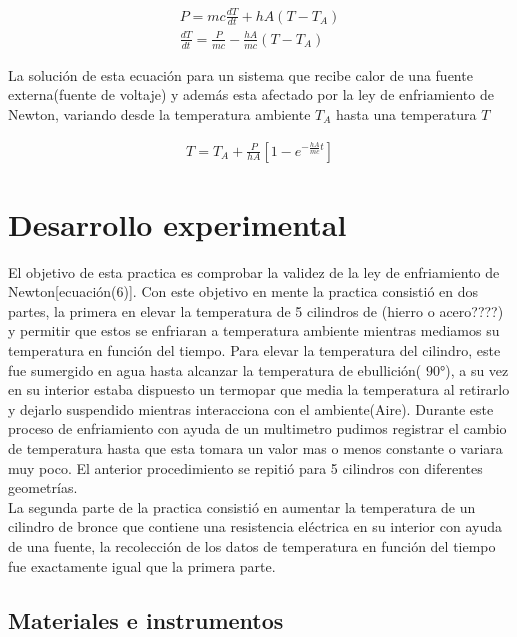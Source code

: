 \documentclass{article}
\begin{document}
\begin{align}
    P = mc \frac{dT}{dt} + hA(T-T_A) \\ 
    \frac{dT}{dt} = \frac{P}{mc} - \frac{hA}{mc}(T-T_A)
\end{align}

La solución de esta ecuación para un sistema que recibe calor de una fuente externa(fuente de voltaje) y además esta afectado por la ley de enfriamiento de Newton, variando desde la temperatura ambiente $T_A$ hasta una temperatura $T$

\begin{align}
    T = T_A +\frac{P}{hA}[1-e^{-\frac{hA}{mc}t}]
\end{align}


\section{Desarrollo experimental}

El objetivo de esta practica es comprobar la validez de la ley de enfriamiento de Newton[ecuación(6)]. Con este objetivo en mente la practica consistió en dos partes, la primera en elevar la temperatura de 5 cilindros de (hierro o acero????)  y permitir que estos se enfriaran a temperatura ambiente mientras mediamos su temperatura en función del tiempo. 
Para elevar la temperatura del cilindro, este fue sumergido en agua hasta alcanzar la temperatura de ebullición( $90°$), a su vez en su interior estaba dispuesto un termopar que media la temperatura al retirarlo y dejarlo suspendido mientras interacciona con el ambiente(Aire). Durante este proceso de enfriamiento con ayuda de un multimetro pudimos registrar el cambio de temperatura hasta que esta tomara un valor mas o menos constante o variara muy poco. El anterior procedimiento se repitió para 5 cilindros con diferentes geometrías.  \\ 
La segunda parte de la practica consistió en aumentar la temperatura de un cilindro de bronce que contiene una resistencia eléctrica en su interior con ayuda de una fuente, la recolección de los datos de temperatura en función del tiempo fue exactamente igual que la primera parte.


\subsection{Materiales e instrumentos}
\end{document}
